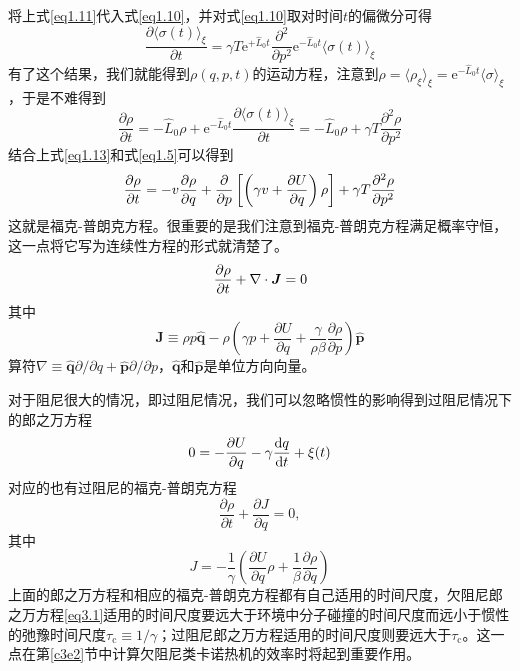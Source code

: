 将上式\eqref{eq1.11}代入式\eqref{eq1.10}，并对式\eqref{eq1.10}取对时间$t$的偏微分可得
\begin{equation}
    \frac{\partial\langle\sigma(t)\rangle_{\xi}}{\partial t}=\gamma T \mathrm{e}^{+\hat{L}_{0} t} \frac{\partial^{2}}{\partial p^{2}} \mathrm{e}^{-\hat{L}_{0} t}\langle\sigma(t)\rangle_{\xi}
    \label{eq1.12}
\end{equation}
有了这个结果，我们就能得到$\rho(q,p,t)$的运动方程，注意到$\rho=\langle\rho_{\xi}\rangle_{\xi}=\mathrm{e}^{-\hat{L}_{0} t} \langle\sigma\rangle_{\xi}$，于是不难得到
\begin{equation}
    \frac{\partial \rho}{\partial t}=-\hat{L}_{0}\rho+\mathrm{e}^{-\hat{L}_{0} t} \frac{\partial\langle\sigma(t)\rangle_{\xi}}{\partial t}=-\hat{L}_{0}\rho+\gamma T \frac{\partial^{2} \rho}{\partial p^{2}}
    \label{eq1.13}
\end{equation}
结合上式\eqref{eq1.13}和式\eqref{eq1.5}可以得到
\begin{equation}
    \frac{\partial \rho}{\partial t}=-v \frac{\partial \rho}{\partial q}+\frac{\partial}{\partial p}\left[\left({\gamma} v+ \frac{\partial U}{\partial q}\right) \rho\right]+\gamma T \frac{\partial^{2} \rho}{\partial p^{2}}
    \label{eq1.14}
\end{equation}
这就是福克-普朗克方程。很重要的是我们注意到福克-普朗克方程满足概率守恒，这一点将它写为连续性方程的形式就清楚了。
\begin{equation}
    \frac{\partial \rho}{\partial t} + \nabla \cdot \bm{J} = 0
\label{eq12.57}
\end{equation}
其中
\begin{equation}
\bm{J} \equiv \rho  p  \hat{\mathbf{q}}-\rho\left(\gamma p+\frac{\partial U}{\partial q} + \frac{\gamma}{\rho \beta} \frac{\partial \rho}{\partial p}\right) \hat{\mathbf{p}}
\label{eq12.57.5}
\end{equation}
算符$\nabla \equiv \hat{\mathbf{q}} \partial / \partial q+\hat{\mathbf{p}} \partial / \partial p$，$\hat{\mathbf{q}}$和$\hat{\mathbf{p}}$是单位方向向量。

对于阻尼很大的情况，即过阻尼情况，我们可以忽略惯性的影响得到过阻尼情况下的郎之万方程
\begin{equation}
    0=-\frac{\partial U}{\partial q}-\gamma \frac{\mathrm{d} q}{\mathrm{d} t}+\xi(t)
    \label{eq1.17}
\end{equation}
对应的也有过阻尼的福克-普朗克方程
\begin{equation}
    \frac{\partial \rho}{\partial t} + \frac{\partial J}{\partial q}=0,
    \label{eq2.45}
\end{equation}
其中
\begin{equation}
    J=-\frac{1}{\gamma} \left(\frac{\partial U}{\partial q} \rho+\frac{1}{\beta} \frac{\partial \rho}{\partial q}\right)
    \label{eq2.45.5}
\end{equation}
上面的郎之万方程和相应的福克-普朗克方程都有自己适用的时间尺度，欠阻尼郎之万方程\eqref{eq3.1}适用的时间尺度要远大于环境中分子碰撞的时间尺度而远小于惯性的弛豫时间尺度$\tau_{\mathrm{c}}\equiv1/\gamma$；过阻尼郎之万方程适用的时间尺度则要远大于$\tau_{\mathrm{c}}$。\cite{Sekimoto2010}这一点在第\ref{c3e2}节中计算欠阻尼类卡诺热机的效率时将起到重要作用。

